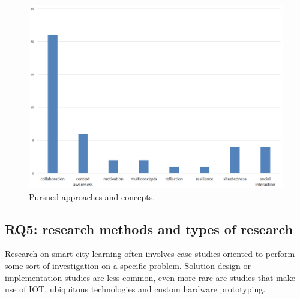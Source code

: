 \begin{figure}[htb]
\centering
\includegraphics[width=12cm]{img/approaches}
\caption{Pursued approaches and concepts.}
\label{fig:approaches}
\end{figure}


\subsection*{RQ5: research methods and types of research}
Research on smart city learning often involves case studies oriented to perform some sort of investigation on a specific problem. Solution design or implementation studies are less common, even more rare are studies that make use of IOT, ubiquitous technologies and custom hardware prototyping.